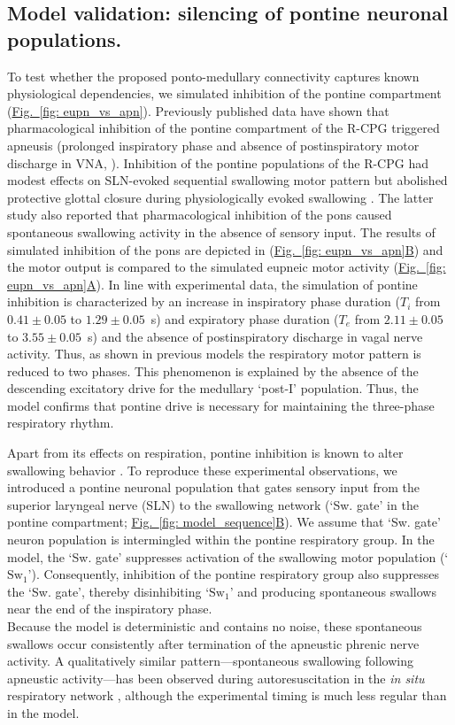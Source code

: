 \documentclass[pdflatex,sn-mathphys-ay]{sn-jnl}%
\renewcommand{\figureautorefname}{Fig.}
\newcommand{\Figref}[2][]{\hyperref[#2]{\figureautorefname~\ref*{#2}#1}}
\theoremstyle{thmstyleone}%
\theoremstyle{thmstyletwo}%
\theoremstyle{thmstylethree}%
\begin{document}
\subsection{Model validation: silencing of pontine neuronal populations.}
To test whether the proposed ponto-medullary connectivity captures known physiological dependencies, we simulated inhibition of the pontine compartment (\Figref[]{fig: eupn_vs_apn}).
Previously published data have shown that pharmacological inhibition of the pontine compartment of the R-CPG triggered apneusis (prolonged inspiratory phase and absence of postinspiratory motor discharge in VNA, \cite{dutschmann2006kolliker}). Inhibition of the pontine populations of the R-CPG had modest effects on SLN-evoked sequential swallowing motor pattern \citep{takemura2022effect} but abolished protective glottal closure during physiologically evoked swallowing \citep{bautista2014ponto}. The latter study also reported that pharmacological inhibition of the pons caused spontaneous swallowing activity in the absence of sensory input. The results of simulated inhibition of the pons are depicted in (\Figref[B]{fig: eupn_vs_apn}) and the motor output is compared to the simulated eupneic motor activity (\Figref[A]{fig: eupn_vs_apn}). In line with experimental data, the simulation of pontine inhibition is characterized by an increase in inspiratory phase duration ($T_i$ from $0.41 \pm 0.05$ to $1.29 \pm 0.05$~s) and expiratory phase duration ($T_e$ from $2.11 \pm 0.05$ to $3.55 \pm 0.05$~s) and the absence of postinspiratory discharge in vagal nerve activity. Thus, as shown in previous models \citep{smith2007spatial} the respiratory motor pattern is reduced to two phases. This phenomenon is explained by the absence of the descending excitatory drive for the medullary `post-I' population. Thus, the model confirms that pontine drive is necessary for maintaining the three-phase respiratory rhythm.

Apart from its effects on respiration, pontine inhibition is known to alter swallowing behavior \citep{takemura2022effect}. To reproduce these experimental observations, we introduced a pontine neuronal population that gates sensory input from the superior laryngeal nerve (SLN) to the swallowing network (`Sw. gate' in the pontine compartment; \Figref[B]{fig: model_sequence}). We assume that `Sw. gate' neuron population is intermingled within the pontine respiratory group. In the model, the `Sw. gate' suppresses activation of the swallowing motor population (`$\text{Sw}_1$').
Consequently, inhibition of the pontine respiratory group also suppresses the `Sw. gate', thereby disinhibiting `$\text{Sw}_1$' and producing spontaneous swallows near the end of the inspiratory phase. \\
Because the model is deterministic and contains no noise, these spontaneous swallows occur consistently after termination of the apneustic phrenic nerve activity. A qualitatively similar pattern---spontaneous swallowing following apneustic activity---has been observed during autoresuscitation in the \textit{in situ} respiratory network \citep{bautista2014spontaneous}, although the experimental timing is much less regular than in the model.
\end{document}
